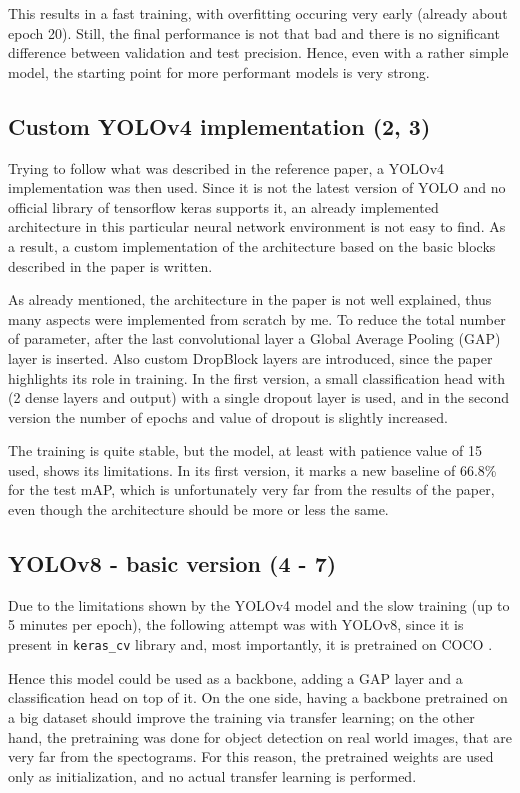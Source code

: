 \documentclass[a4paper,12pt]{article}
\begin{document}
This results in a fast training, with overfitting occuring very early (already about epoch 20). Still, the final performance is not that bad and there is no significant difference between validation and test precision. Hence, even with a rather simple model, the starting point for more performant models is very strong.


\subsection{Custom YOLOv4 implementation (2, 3)}
Trying to follow what was described in the reference paper, a YOLOv4 implementation was then used. Since it is not the latest version of YOLO and no official library of tensorflow keras supports it, an already implemented architecture in this particular neural network environment is not easy to find. As a result, a custom implementation of the architecture based on the basic blocks described in the paper is written.

As already mentioned, the architecture in the paper is not well explained, thus many aspects were implemented from scratch by me. To reduce the total number of parameter, after the last convolutional layer a Global Average Pooling (GAP) layer is inserted. Also custom DropBlock layers are introduced, since the paper highlights its role in training. In the first version, a small classification head with (2 dense layers and output) with a single dropout layer is used, and in the second version the number of epochs and value of dropout is slightly increased.

The training is quite stable, but the model, at least with patience value of 15 used, shows its limitations. In its first version, it marks a new baseline of 66.8\% for the test mAP, which is unfortunately very far from the results of the paper, even though the architecture should be more or less the same. 


\subsection{YOLOv8 - basic version (4 - 7)}
Due to the limitations shown by the YOLOv4 model and the slow training (up to 5 minutes per epoch), the following attempt was with YOLOv8, since it is present in \texttt{keras\_cv} library and, most importantly, it is pretrained on COCO \cite{coco_dataset}.

Hence this model could be used as a backbone, adding a GAP layer and a classification head on top of it. On the one side, having a backbone pretrained on a big dataset should improve the training via transfer learning; on the other hand, the pretraining was done for object detection on real world images, that are very far from the spectograms. For this reason, the pretrained weights are used only as initialization, and no actual transfer learning is performed.
\end{document}

